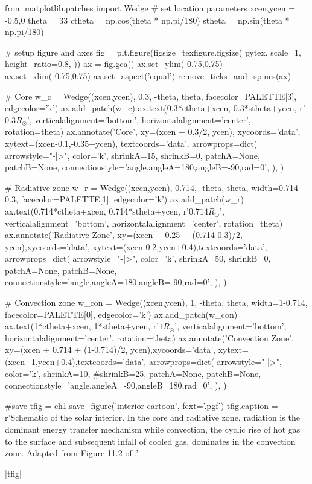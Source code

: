 \begin{pycode}[chapter1]
from matplotlib.patches import Wedge
# set location parameters
xcen,ycen = -0.5,0
theta = 33
ctheta = np.cos(theta * np.pi/180)
stheta = np.sin(theta * np.pi/180)

# setup figure and axes
fig = plt.figure(figsize=texfigure.figsize(
    pytex,
    scale=1,
    height_ratio=0.8,
))
ax = fig.gca()
ax.set_ylim(-0.75,0.75)
ax.set_xlim(-0.75,0.75)
ax.set_aspect('equal')
remove_ticks_and_spines(ax)

# Core
w_c = Wedge((xcen,ycen), 0.3, -theta, theta,
            facecolor=PALETTE[3], edgecolor='k')
ax.add_patch(w_c)
ax.text(0.3*ctheta+xcen, 0.3*stheta+ycen, r'$0.3R_\odot$',
        verticalalignment='bottom', horizontalalignment='center',
        rotation=theta)
ax.annotate('Core',
            xy=(xcen + 0.3/2, ycen), xycoords='data',
            xytext=(xcen-0.1,-0.35+ycen), textcoords='data',
            arrowprops=dict(
                arrowstyle="-|>",
                color='k',
                shrinkA=15, shrinkB=0,
                patchA=None,
                patchB=None,
                connectionstyle='angle,angleA=180,angleB=-90,rad=0',
            ),
)

# Radiative zone
w_r = Wedge((xcen,ycen), 0.714, -theta, theta,
            width=0.714-0.3,
            facecolor=PALETTE[1], edgecolor='k')
ax.add_patch(w_r)
ax.text(0.714*ctheta+xcen, 0.714*stheta+ycen,
        r'$0.714R_\odot$',
        verticalalignment='bottom', horizontalalignment='center',
        rotation=theta)
ax.annotate('Radiative Zone',
            xy=(xcen + 0.25 + (0.714-0.3)/2, ycen),xycoords='data',
            xytext=(xcen-0.2,ycen+0.4),textcoords='data',
            arrowprops=dict(
                arrowstyle="-|>",
                color='k',
                shrinkA=50, shrinkB=0,
                patchA=None,
                patchB=None,
                connectionstyle='angle,angleA=180,angleB=-90,rad=0',
            ),
)

# Convection zone
w_con = Wedge((xcen,ycen), 1, -theta, theta,
              width=1-0.714,
              facecolor=PALETTE[0], edgecolor='k')
ax.add_patch(w_con)
ax.text(1*ctheta+xcen, 1*stheta+ycen,
        r'$1R_\odot$',
        verticalalignment='bottom', horizontalalignment='center',
        rotation=theta)
ax.annotate('Convection Zone',
            xy=(xcen + 0.714 + (1-0.714)/2, ycen),xycoords='data',
            xytext=(xcen+1,ycen+0.4),textcoords='data',
            arrowprops=dict(
                arrowstyle="-|>",
                color='k',
                shrinkA=10, #shrinkB=25,
                patchA=None,
                patchB=None,
                connectionstyle='angle,angleA=-90,angleB=180,rad=0',
            ),
)

#save
tfig = ch1.save_figure('interior-cartoon', fext='.pgf')
tfig.caption = r'Schematic of the solar interior. In the core and radiative zone, radiation is the dominant energy transfer mechanism while convection, the cyclic rise of hot gas to the surface and subsequent infall of cooled gas, dominates in the convection zone. Adapted from Figure 11.2 of \citet{carroll_introduction_2007}.'
\end{pycode}
\py[chapter1]|tfig|

